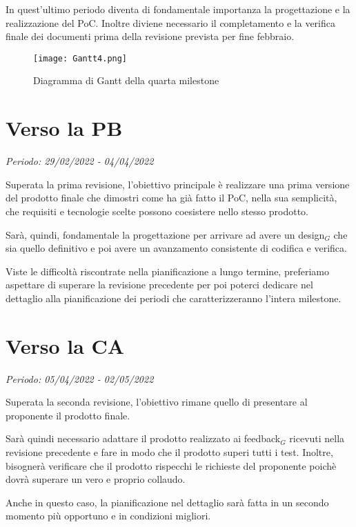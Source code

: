 In quest'ultimo periodo diventa di fondamentale importanza la progettazione e la realizzazione
 del PoC. Inoltre diviene necessario il completamento e la verifica finale dei documenti prima della revisione prevista 
 per fine febbraio.


\begin{figure}[!ht]
    \texttt{[image: Gantt4.png]}
    \caption{Diagramma di Gantt della quarta milestone} 
\end{figure}

\section{Verso la PB}

\textit{Periodo: 29/02/2022 - 04/04/2022}

Superata la prima revisione, l'obiettivo principale è realizzare una prima versione del prodotto finale che dimostri come ha già fatto il PoC, nella sua semplicità, 
che requisiti e tecnologie scelte possono coesistere nello stesso prodotto. 

Sarà, quindi, fondamentale la progettazione per arrivare ad avere un design$_G$ che sia quello definitivo e poi avere un avanzamento consistente di codifica e verifica.

Viste le difficoltà riscontrate nella pianificazione a lungo termine, preferiamo aspettare di superare la revisione precedente per poi poterci dedicare nel dettaglio
alla pianificazione dei periodi che caratterizzeranno l'intera milestone.

\section{Verso la CA}

\textit{Periodo: 05/04/2022 - 02/05/2022}

Superata la seconda revisione, l'obiettivo rimane quello di presentare al proponente il prodotto finale.

Sarà quindi necessario adattare il prodotto realizzato ai feedback$_G$ ricevuti nella revisione precedente e fare in modo che il prodotto superi tutti i test. Inoltre, bisognerà
verificare che il prodotto rispecchi le richieste del proponente poichè dovrà superare un vero e proprio collaudo.

Anche in questo caso, la pianificazione nel dettaglio sarà fatta in un secondo momento più opportuno e in condizioni migliori.